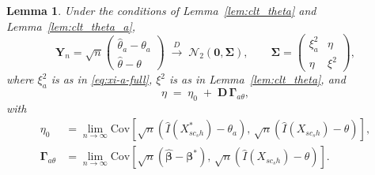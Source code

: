 \documentclass[12pt]{article}
\theoremstyle{plain}
\newtheorem{lemma}{Lemma}
\theoremstyle{definition}
\begin{document}
\begin{lemma}
\label{lem:joint_clt_corrected}
Under the conditions of Lemma~\ref{lem:clt_theta} and Lemma~\ref{lem:clt_theta_a},
\begin{equation}
\mathbf{Y}_n = \sqrt n
\begin{pmatrix}
\hat\theta_a-\theta_a\\
\hat\theta-\theta
\end{pmatrix}
\;\xrightarrow{D}\;
\mathcal N_2(\mathbf 0,\boldsymbol\Sigma),
\qquad
\boldsymbol\Sigma =
\begin{pmatrix}
\xi_a^2 & \eta\\
\eta & \xi^2
\end{pmatrix},
\label{eq:joint-clt-corrected}
\end{equation}
where $\xi_a^2$ is as in \eqref{eq:xi-a-full}, $\xi^2$ is as in Lemma~\ref{lem:clt_theta}, and
\begin{equation}
\eta \;=\; \eta_0 \;+\; \mathbf D\,\boldsymbol\Gamma_{a\theta},
\label{eq:eta-full}
\end{equation}
with
\begin{align}
\eta_0 &= \lim_{n\to\infty}\mathrm{Cov}\!\left[\sqrt n\left(\hat I(X^*_{sc_sh})-\theta_a\right),\,\sqrt n\left(\hat I(X_{sc_sh})-\theta\right)\right],
\label{eq:eta0-def}\\
\boldsymbol\Gamma_{a\theta} &= \lim_{n\to\infty}\mathrm{Cov}\!\left[\sqrt n\left(\hat{\boldsymbol\beta}-\boldsymbol\beta^*\right),\,\sqrt n\left(\hat I(X_{sc_sh})-\theta\right)\right].
\label{eq:Gamma-atheta-def}
\end{align}
\end{lemma}
 
\end{document}

